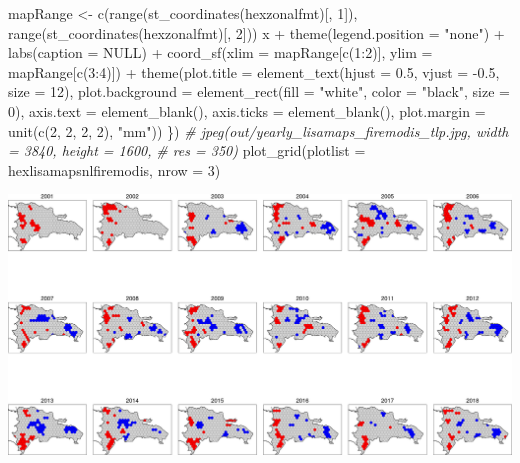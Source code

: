 \documentclass[10pt,landscape,a3paper]{article}
\newenvironment{Shaded}{\begin{snugshade}}{\end{snugshade}}
\newcommand{\AttributeTok}[1]{\textcolor[rgb]{0.77,0.63,0.00}{#1}}
\newcommand{\CommentTok}[1]{\textcolor[rgb]{0.56,0.35,0.01}{\textit{#1}}}
\newcommand{\ConstantTok}[1]{\textcolor[rgb]{0.00,0.00,0.00}{#1}}
\newcommand{\DecValTok}[1]{\textcolor[rgb]{0.00,0.00,0.81}{#1}}
\newcommand{\FloatTok}[1]{\textcolor[rgb]{0.00,0.00,0.81}{#1}}
\newcommand{\FunctionTok}[1]{\textcolor[rgb]{0.00,0.00,0.00}{#1}}
\newcommand{\NormalTok}[1]{#1}
\newcommand{\OtherTok}[1]{\textcolor[rgb]{0.56,0.35,0.01}{#1}}
\newcommand{\SpecialCharTok}[1]{\textcolor[rgb]{0.00,0.00,0.00}{#1}}
\newcommand{\StringTok}[1]{\textcolor[rgb]{0.31,0.60,0.02}{#1}}
\begin{document}
\begin{Shaded}
\begin{Highlighting}[]
\NormalTok{    mapRange }\OtherTok{\textless{}{-}} \FunctionTok{c}\NormalTok{(}\FunctionTok{range}\NormalTok{(}\FunctionTok{st\_coordinates}\NormalTok{(hexzonalfmt)[, }\DecValTok{1}\NormalTok{]), }\FunctionTok{range}\NormalTok{(}\FunctionTok{st\_coordinates}\NormalTok{(hexzonalfmt)[,}
        \DecValTok{2}\NormalTok{]))}
\NormalTok{    x }\SpecialCharTok{+} \FunctionTok{theme}\NormalTok{(}\AttributeTok{legend.position =} \StringTok{"none"}\NormalTok{) }\SpecialCharTok{+} \FunctionTok{labs}\NormalTok{(}\AttributeTok{caption =} \ConstantTok{NULL}\NormalTok{) }\SpecialCharTok{+} \FunctionTok{coord\_sf}\NormalTok{(}\AttributeTok{xlim =}\NormalTok{ mapRange[}\FunctionTok{c}\NormalTok{(}\DecValTok{1}\SpecialCharTok{:}\DecValTok{2}\NormalTok{)],}
        \AttributeTok{ylim =}\NormalTok{ mapRange[}\FunctionTok{c}\NormalTok{(}\DecValTok{3}\SpecialCharTok{:}\DecValTok{4}\NormalTok{)]) }\SpecialCharTok{+} \FunctionTok{theme}\NormalTok{(}\AttributeTok{plot.title =} \FunctionTok{element\_text}\NormalTok{(}\AttributeTok{hjust =} \FloatTok{0.5}\NormalTok{, }\AttributeTok{vjust =} \SpecialCharTok{{-}}\FloatTok{0.5}\NormalTok{,}
        \AttributeTok{size =} \DecValTok{12}\NormalTok{), }\AttributeTok{plot.background =} \FunctionTok{element\_rect}\NormalTok{(}\AttributeTok{fill =} \StringTok{"white"}\NormalTok{, }\AttributeTok{color =} \StringTok{"black"}\NormalTok{,}
        \AttributeTok{size =} \DecValTok{0}\NormalTok{), }\AttributeTok{axis.text =} \FunctionTok{element\_blank}\NormalTok{(), }\AttributeTok{axis.ticks =} \FunctionTok{element\_blank}\NormalTok{(), }\AttributeTok{plot.margin =} \FunctionTok{unit}\NormalTok{(}\FunctionTok{c}\NormalTok{(}\DecValTok{2}\NormalTok{,}
        \DecValTok{2}\NormalTok{, }\DecValTok{2}\NormalTok{, }\DecValTok{2}\NormalTok{), }\StringTok{"mm"}\NormalTok{))}
\NormalTok{\})}
\CommentTok{\# jpeg(\textquotesingle{}out/yearly\_lisamaps\_firemodis\_tlp.jpg\textquotesingle{}, width = 3840, height = 1600,}
\CommentTok{\# res = 350)}
\FunctionTok{plot\_grid}\NormalTok{(}\AttributeTok{plotlist =}\NormalTok{ hexlisamapsnlfiremodis, }\AttributeTok{nrow =} \DecValTok{3}\NormalTok{)}
\end{Highlighting}
\end{Shaded}

\begin{center}\includegraphics{img/modelling/aa-lisa-maps-3} \end{center}
\end{document}

